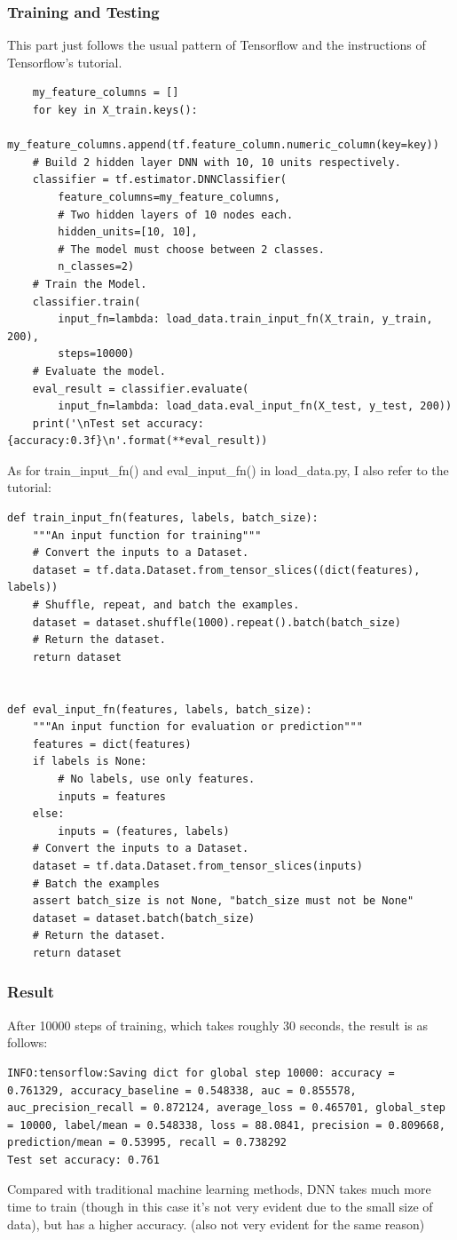 \documentclass[a4paper]{article}
\begin{document}
            \subsubsection{Training and Testing}
This part just follows the usual pattern of Tensorflow and the instructions of Tensorflow's tutorial.
\begin{verbatim}
    my_feature_columns = []
    for key in X_train.keys():
        my_feature_columns.append(tf.feature_column.numeric_column(key=key))
    # Build 2 hidden layer DNN with 10, 10 units respectively.
    classifier = tf.estimator.DNNClassifier(
        feature_columns=my_feature_columns,
        # Two hidden layers of 10 nodes each.
        hidden_units=[10, 10],
        # The model must choose between 2 classes.
        n_classes=2)
    # Train the Model.
    classifier.train(
        input_fn=lambda: load_data.train_input_fn(X_train, y_train, 200),
        steps=10000)
    # Evaluate the model.
    eval_result = classifier.evaluate(
        input_fn=lambda: load_data.eval_input_fn(X_test, y_test, 200))
    print('\nTest set accuracy: {accuracy:0.3f}\n'.format(**eval_result))
\end{verbatim}
As for train\_input\_fn() and eval\_input\_fn() in load\_data.py, I also refer to the tutorial:
\begin{verbatim}
def train_input_fn(features, labels, batch_size):
    """An input function for training"""
    # Convert the inputs to a Dataset.
    dataset = tf.data.Dataset.from_tensor_slices((dict(features), labels))
    # Shuffle, repeat, and batch the examples.
    dataset = dataset.shuffle(1000).repeat().batch(batch_size)
    # Return the dataset.
    return dataset


def eval_input_fn(features, labels, batch_size):
    """An input function for evaluation or prediction"""
    features = dict(features)
    if labels is None:
        # No labels, use only features.
        inputs = features
    else:
        inputs = (features, labels)
    # Convert the inputs to a Dataset.
    dataset = tf.data.Dataset.from_tensor_slices(inputs)
    # Batch the examples
    assert batch_size is not None, "batch_size must not be None"
    dataset = dataset.batch(batch_size)
    # Return the dataset.
    return dataset
\end{verbatim}
            \subsubsection{Result}
After 10000 steps of training, which takes roughly 30 seconds, the result is as follows:
\begin{verbatim}
INFO:tensorflow:Saving dict for global step 10000: accuracy = 0.761329, accuracy_baseline = 0.548338, auc = 0.855578, auc_precision_recall = 0.872124, average_loss = 0.465701, global_step = 10000, label/mean = 0.548338, loss = 88.0841, precision = 0.809668, prediction/mean = 0.53995, recall = 0.738292
Test set accuracy: 0.761
\end{verbatim}
Compared with traditional machine learning methods, DNN takes much more time to train (though in this case it's not very evident due to the small size of data), but has a higher accuracy. (also not very evident for the same reason)
\end{document}
